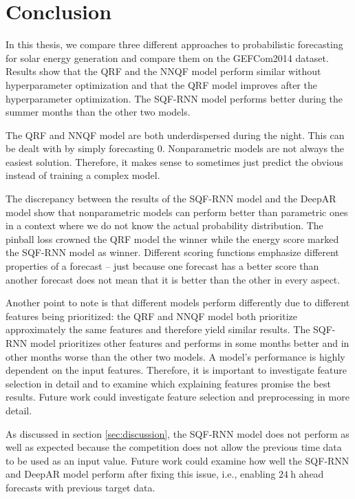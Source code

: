 \section{Conclusion}
\label{sec:conclusion}

In this thesis, we compare three different approaches to probabilistic forecasting 
for solar energy generation and compare them on the GEFCom2014 dataset. 
Results show that the QRF and the NNQF model perform similar without 
hyperparameter optimization and that the QRF model improves after the hyperparameter 
optimization. The SQF-RNN model performs better during the summer months than the other two models. 

The QRF and NNQF model are both underdispersed during the night. This can be dealt with by simply forecasting \(0\). 
Nonparametric models are not always the easiest solution. Therefore, it makes sense to sometimes just predict the obvious 
instead of training a complex model.

The discrepancy between the results of the SQF-RNN model and the DeepAR model show that 
nonparametric models can perform better than parametric ones in a context where we do not know the actual probability distribution. 
The pinball loss crowned the QRF model the winner while the energy score marked the SQF-RNN model as winner. 
Different scoring functions emphasize different properties of a forecast -- just because one forecast has a 
better score than another forecast does not mean that it is better than the other in every aspect.

Another point to note is that different models perform differently due to different features being 
prioritized: the QRF and NNQF model both prioritize approximately the same features and therefore 
yield similar results. The SQF-RNN model prioritizes other features and performs in some months better 
and in other months worse than the other two models. A model's performance is highly dependent on the input features.
Therefore, it is important to investigate feature selection in detail and to examine which explaining features promise the best results. 
Future work could investigate feature selection and preprocessing in more detail. 

As discussed in section \ref{sec:discussion}, the SQF-RNN model does not perform as well as expected 
because the competition does not allow the previous time data to be used as an input value. 
Future work could examine how well the SQF-RNN and DeepAR model perform after fixing this issue, 
i.e., enabling \(\SI{24}{\hour}\) ahead forecasts with previous target data. 